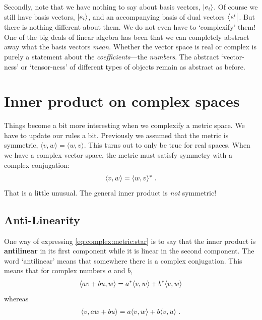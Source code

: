 Secondly, note that we have nothing to say about basis vectors, $\left|e_i\right\rangle$. Of course we still have basis vectors, $\left|e_i\right\rangle$, and an accompanying basis of dual vectors $\left\langle e^i\right|$. But there is nothing different about them. We do not even have to `complexify' them! One of the big deals of linear algebra has been that we can completely abstract away what the basis vectors \emph{mean}. Whether the vector space is real or complex is purely a statement about the \emph{coefficients}---the \emph{numbers}. The abstract `vector-ness' or `tensor-ness' of different types of objects remain as abstract as before.



\section{Inner product on complex spaces}

Things become a bit more interesting when we complexify a metric space. We have to update our rules a bit. Previously we assumed that the metric is symmetric, $\langle v, w\rangle = \langle w, v\rangle$. This turns out to only be true for real spaces. When we have a complex vector space, the metric must satisfy symmetry with a complex conjugation:
\begin{align}
    \langle v, w \rangle = \langle w, v \rangle^* \ .
    \label{eq:complex:metric:star}
\end{align}
That is a little unusual. The general inner product is \emph{not} symmetric!

\subsection{Anti-Linearity}

One way of expressing \eqref{eq:complex:metric:star} is to say that the inner product is \textbf{antilinear} in its first component while it is linear in the second component. The word `antilinear' means that somewhere there is a complex conjugation. This means that for complex numbers $a$ and $b$,
\begin{align}
    \langle av + bu, w \rangle = 
    a^* \langle v, w\rangle
    +
    b^* \langle v, w\rangle
\end{align}
whereas 
\begin{align}
    \langle v, aw + bu \rangle = 
    a \langle v, w\rangle
    +
    b \langle v, u\rangle \ .
\end{align}


